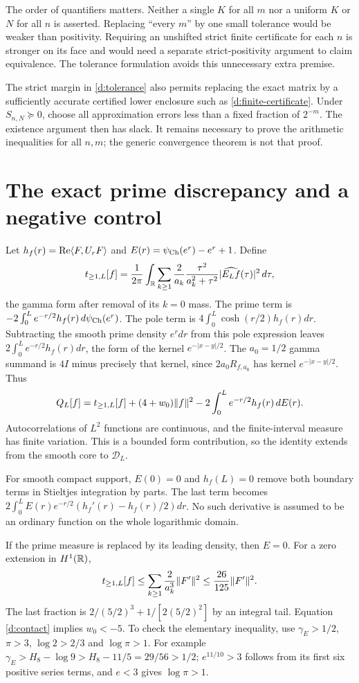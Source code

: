 The order of quantifiers matters. Neither a single $K$ for all $m$ nor a
uniform $K$ or $N$ for all $n$ is asserted. Replacing ``every $m$'' by one
small tolerance would be weaker than positivity. Requiring an unshifted
strict finite certificate for each $n$ is stronger on its face and would
need a separate strict-positivity argument to claim equivalence.
The tolerance formulation avoids this unnecessary extra premise.

The strict margin in \eqref{d:tolerance} also permits replacing the exact
matrix by a sufficiently accurate certified lower enclosure such as
\eqref{d:finite-certificate}. Under $S_{n,N}\succeq0$, choose all approximation
errors less than a fixed fraction of $2^{-m}$. The existence argument
then has slack. It remains necessary to prove the arithmetic inequalities
for all $n,m$; the generic convergence theorem is not that proof.

\section{The exact prime discrepancy and a negative control}
Let $h_f(r)=\operatorname{Re}\langle F,U_rF\rangle$ and
$E(r)=\psi_{\rm Ch}(e^r)-e^r+1$. Define
\[
t_{\ge1,L}[f]=\frac1{2\pi}\int_\mathbb R
\sum_{k\ge1}\frac2{a_k}\frac{\tau^2}{a_k^2+\tau^2}
|\widehat{E_Lf}(\tau)|^2\,d\tau,
\]
the gamma form after removal of its $k=0$ mass. The prime term is
$-2\int_0^L e^{-r/2}h_f(r)\,d\psi_{\rm Ch}(e^r)$.
The pole term is $4\int_0^L\cosh(r/2)h_f(r)dr$.
Subtracting the smooth prime density $e^rdr$ from this pole expression
leaves $2\int_0^Le^{-r/2}h_f(r)dr$, the form of the kernel
$e^{-|x-y|/2}$. The $a_0=1/2$ gamma summand is $4I$ minus precisely
that kernel, since $2a_0R_{f,a_0}$ has kernel $e^{-|x-y|/2}$.
Thus
\begin{equation}\label{d:discrepancy}
Q_L[f]=t_{\ge1,L}[f]+(4+w_0)\lVert f\rVert^2
-2\int_0^Le^{-r/2}h_f(r)\,dE(r).
\end{equation}
Autocorrelations of $L^2$ functions are continuous, and the finite-interval
measure has finite variation. This is a bounded form contribution, so
the identity extends from the smooth core to $\mathcal D_L$.

For smooth compact support, $E(0)=0$ and $h_f(L)=0$ remove both boundary
terms in Stieltjes integration by parts. The last term becomes
$2\int_0^L E(r)e^{-r/2}(h_f'(r)-h_f(r)/2)dr$. No such derivative is
assumed to be an ordinary function on the whole logarithmic domain.

If the prime measure is replaced by its leading density, then $E=0$.
For a zero extension in $H^1(\mathbb R)$,
\[
t_{\ge1,L}[f]\le\sum_{k\ge1}\frac2{a_k^3}\lVert F'\rVert^2
\le\frac{26}{125}\lVert F'\rVert^2.
\]
The last fraction is $2/(5/2)^3+1/[2(5/2)^2]$ by an integral tail.
Equation \eqref{d:contact} implies $w_0<-5$. To check the elementary
inequality, use $\gamma_E>1/2$, $\pi>3$, $\log2>2/3$ and $\log\pi>1$.
For example
$\gamma_E>H_8-\log9>H_8-11/5=29/56>1/2$;
$e^{11/10}>3$ follows from its first six positive series terms,
and $e<3$ gives $\log\pi>1$.

